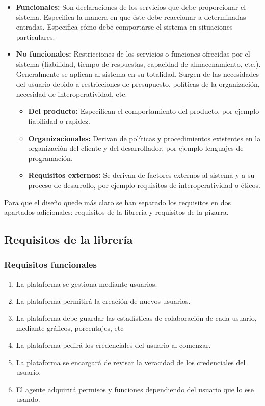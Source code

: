 \begin{itemize}
	\item \textbf{Funcionales: }Son declaraciones de los servicios que debe proporcionar el sistema. Especifica la manera en que éste debe reaccionar a determinadas entradas. Especifica cómo debe comportarse el sistema en situaciones particulares.
	\item \textbf{No funcionales: } Restricciones de los servicios o funciones ofrecidas por el sistema (fiabilidad, tiempo de respuestas, capacidad de almacenamiento, etc.). Generalmente se aplican al sistema en su totalidad. Surgen de las necesidades del usuario debido a restricciones de presupuesto, políticas de la organización, necesidad de interoperatividad, etc.
	\begin{itemize}
		\item\textbf{Del producto:} Especifican el comportamiento del producto, por ejemplo fiabilidad o rapidez.
		\item\textbf{Organizacionales:} Derivan de políticas y procedimientos existentes en la organización del cliente y del desarrollador, por ejemplo lenguajes de programación.
		\item\textbf{Requisitos externos:} Se derivan de factores externos al sistema y a su proceso de desarrollo, por ejemplo requisitos de interoperatividad o éticos.
	\end{itemize}
\end{itemize}

Para que el diseño quede más claro se han separado los requisitos en dos apartados adicionales: requisitos de la librería y requisitos de la pizarra. 

\subsection{Requisitos de la librería}
\subsubsection{Requisitos funcionales}
	\begin{enumerate}
		\item La plataforma se gestiona mediante usuarios.
		\item La plataforma permitirá la creación de nuevos usuarios.
		\item La plataforma debe guardar las estadísticas de colaboración de cada usuario, mediante gráficos, porcentajes, etc
		\item La plataforma pedirá los credenciales del usuario al comenzar.
		\item La plataforma se encargará de revisar la veracidad de los credenciales del usuario.
		\item El agente adquirirá permisos y funciones dependiendo del usuario que lo ese usando.
	\end{enumerate}
